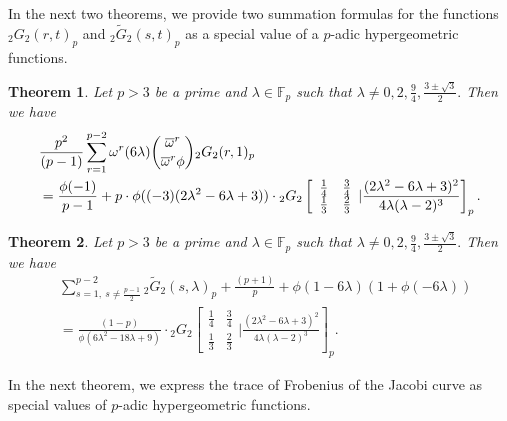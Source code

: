 \documentclass[12pt]{amsart}
\theoremstyle{plain}
\newtheorem{theorem}{Theorem}[section]
\theoremstyle{definition}
\theoremstyle{remark}
\numberwithin{equation}{section}
\begin{document}
	In the next two theorems, we provide two summation formulas for the functions ${_2G_2}(r,t)_p$ and $\tilde{_2G_2}(s,t)_p$ as a special value of a $p$-adic hypergeometric functions. 
	
	\begin{theorem}\label{theorem-summation-1}
	Let  $p>3$ be a prime and $\lambda\in \mathbb{F}_p$ such that $\lambda\neq0,2,\frac{9}{4},\frac{3\pm\sqrt{3}}{2}.$ Then we have 
	\begin{align} 
	&\frac{p^2}{(p-1)} \sum_{r=1}^{p-2}{\omega}^r(6\lambda)  \binom{\overline{\omega}^r}{\overline{\omega}^r\phi}{_2G_2}(r,1)_p\notag\\&= \frac{\phi(-1)}{p-1}
  +p\cdot\phi((-3)(2\lambda^2-6\lambda+3)) \cdot{_2G_2}\left[\begin{array}{cc}
  \frac{1}{4}   & \frac{3}{4}  \\
  \frac{1}{3}    & \frac{2}{3}  \end{array}|\frac{(2\lambda^2-6\lambda+3)^2}{4\lambda(\lambda-2)^3}\right]_p.\notag
   \end{align}
	\end{theorem}
	
	
	
	\begin{theorem}\label{theorem-summation-2}
	Let  $p>3$ be a prime and $\lambda\in \mathbb{F}_p$ such that $\lambda\neq0,2,\frac{9}{4},\frac{3\pm\sqrt{3}}{2}.$ Then we have 
\begin{align*}
	&\sum\limits_{s=1,\ s\neq\frac{p-1}{2}}^{p-2}\tilde{_2G_2}(s,\lambda)_p+\frac{(p+1)}{p}+ \phi(1-6\lambda)(1+\phi(-6\lambda))\\&=\frac{(1-p)}{\phi(6\lambda^2-18\lambda+9)} \cdot {}_2G_2\left[\begin{array}{cc}
  \frac{1}{4}   & \frac{3}{4}  \\
  \frac{1}{3}    & \frac{2}{3}  \end{array}|\frac{(2\lambda^2-6\lambda+3)^2}{4\lambda(\lambda-2)^3}\right]_p.
\end{align*}
	\end{theorem}
	In the next theorem, we express the trace of Frobenius of the Jacobi curve as special values of $p$-adic hypergeometric functions.
	
\end{document}
